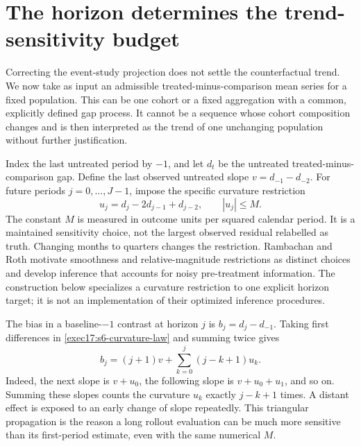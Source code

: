 \section{The horizon determines the trend-sensitivity budget}
\label{exec17:s6-curvature}

Correcting the event-study projection does not settle the counterfactual
trend. We now take as input an admissible treated-minus-comparison mean
series for a fixed population. This can be one cohort or a fixed aggregation
with a common, explicitly defined gap process. It cannot be a sequence whose
cohort composition changes and is then interpreted as the trend of one
unchanging population without further justification.

Index the last untreated period by $-1$, and let $d_t$ be the untreated
treated-minus-comparison gap. Define the last observed untreated slope
$v=d_{-1}-d_{-2}$. For future periods $j=0,\ldots,J-1$, impose the
specific curvature restriction
\begin{equation}
 u_j=d_j-2d_{j-1}+d_{j-2},\qquad |u_j|\leq M.
 \label{exec17:s6-curvature-law}
\end{equation}
The constant $M$ is measured in outcome units per squared calendar period.
It is a maintained sensitivity choice, not the largest observed residual
relabelled as truth. Changing months to quarters changes the restriction.
Rambachan and Roth motivate smoothness and relative-magnitude restrictions
as distinct choices and develop inference that accounts for noisy
pre-treatment information. The construction below specializes a curvature
restriction to one explicit horizon target; it is not an implementation of
their optimized inference procedures.~\citep{rambachan2023}

The bias in a baseline-$-1$ contrast at horizon $j$ is
$b_j=d_j-d_{-1}$. Taking first differences in
\eqref{exec17:s6-curvature-law} and summing twice gives
\begin{equation}
 b_j=(j+1)v+\sum_{k=0}^{j}(j-k+1)u_k.
 \label{exec17:s6-triangular}
\end{equation}
Indeed, the next slope is $v+u_0$, the following slope is
$v+u_0+u_1$, and so on. Summing these slopes counts the curvature
$u_k$ exactly $j-k+1$ times. A distant effect is exposed to an early
change of slope repeatedly. This triangular propagation is the reason a
long rollout evaluation can be much more sensitive than its first-period
estimate, even with the same numerical $M$.

